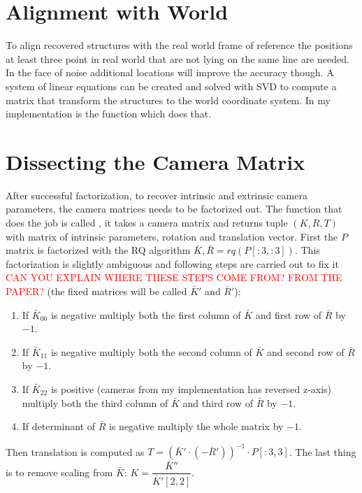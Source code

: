 \documentclass[12pt]{article}
\begin{document}
\section{Alignment with World}

To align recovered structures with the real world frame of reference the
positions at least three point in real world that are not lying on the same line
are needed. In the face of noise additional locations will improve the accuracy
though. A system of linear equations can be created and solved with SVD to
compute a matrix that transform the structures to the world coordinate system.
In my implementation  is the function which
does that.

\section{Dissecting the Camera Matrix}

After successful factorization, to recover intrinsic and extrinsic camera
parameters, the camera matrices needs to be factorized out. The function that
does the job is called , it takes a camera matrix and returns
tuple $(K, R, T)$ with matrix of intrinsic parameters, rotation and translation
vector. First the $P$ matrix is factorized with the RQ algorithm $\bar{K},
\bar{R} = rq(P[:3, :3])$. This factorization is slightly ambiguous and following
steps are carried out to fix it \textcolor{red}{CAN YOU EXPLAIN WHERE THESE STEPS COME FROM? FROM THE PAPER?} (the fixed matrices will be called $\bar{K}'$ and
$\bar{R}'$):

\begin{enumerate}
\item If $\bar{K}_{00}$ is negative multiply both the first column of $\bar{K}$ and first row
of $\bar{R}$ by $-1$.
\item If $\bar{K}_{11}$ is negative multiply both the second column of $\bar{K}$ and second row
of $\bar{R}$ by $-1$.
\item If $\bar{K}_{22}$ is positive (cameras from my implementation has reversed z-axis)
multiply both the third column of $\bar{K}$ and third row of $\bar{R}$ by $-1$.
\item If determinant of $\bar{R}$ is negative multiply the whole matrix by $-1$.
\end{enumerate}

Then translation is computed as $T = (\bar{K}' \cdot (-\bar{R}'))^{-1} \cdot
P[:3, 3]$. The  last thing is to remove scaling from $\bar{K}$: $K =
\dfrac{\bar{K}''}{\bar{K}'[2,2]}$.
\end{document}

